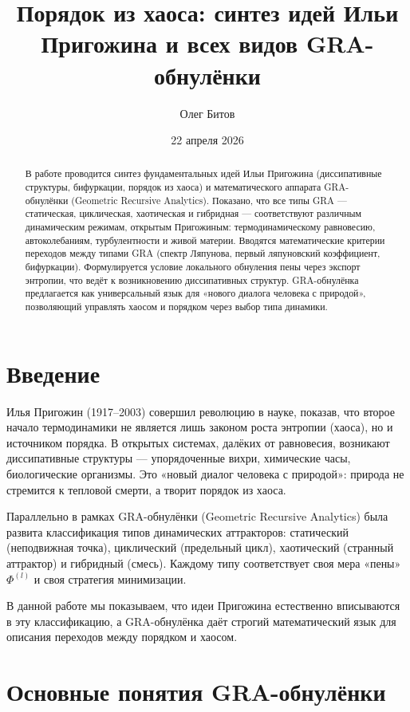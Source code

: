 \documentclass[12pt,a4paper]{article}
\title{Порядок из хаоса: синтез идей Ильи Пригожина и всех видов GRA-обнулёнки}
\author{Олег Битов}
\date{22 апреля 2026}
\begin{document}
\maketitle

\begin{abstract}
В работе проводится синтез фундаментальных идей Ильи Пригожина (диссипативные структуры, бифуркации, порядок из хаоса) и математического аппарата GRA-обнулёнки (Geometric Recursive Analytics). Показано, что все типы GRA — статическая, циклическая, хаотическая и гибридная — соответствуют различным динамическим режимам, открытым Пригожиным: термодинамическому равновесию, автоколебаниям, турбулентности и живой материи. Вводятся математические критерии переходов между типами GRA (спектр Ляпунова, первый ляпуновский коэффициент, бифуркации). Формулируется условие локального обнуления пены через экспорт энтропии, что ведёт к возникновению диссипативных структур. GRA-обнулёнка предлагается как универсальный язык для «нового диалога человека с природой», позволяющий управлять хаосом и порядком через выбор типа динамики.
\end{abstract}

\section{Введение}

Илья Пригожин (1917–2003) совершил революцию в науке, показав, что второе начало термодинамики не является лишь законом роста энтропии (хаоса), но и источником порядка. В открытых системах, далёких от равновесия, возникают диссипативные структуры — упорядоченные вихри, химические часы, биологические организмы. Это «новый диалог человека с природой»: природа не стремится к тепловой смерти, а творит порядок из хаоса.

Параллельно в рамках GRA-обнулёнки (Geometric Recursive Analytics) была развита классификация типов динамических аттракторов: статический (неподвижная точка), циклический (предельный цикл), хаотический (странный аттрактор) и гибридный (смесь). Каждому типу соответствует своя мера «пены» \(\Phi^{(l)}\) и своя стратегия минимизации.

В данной работе мы показываем, что идеи Пригожина естественно вписываются в эту классификацию, а GRA-обнулёнка даёт строгий математический язык для описания переходов между порядком и хаосом.

\section{Основные понятия GRA-обнулёнки}
\end{document}
